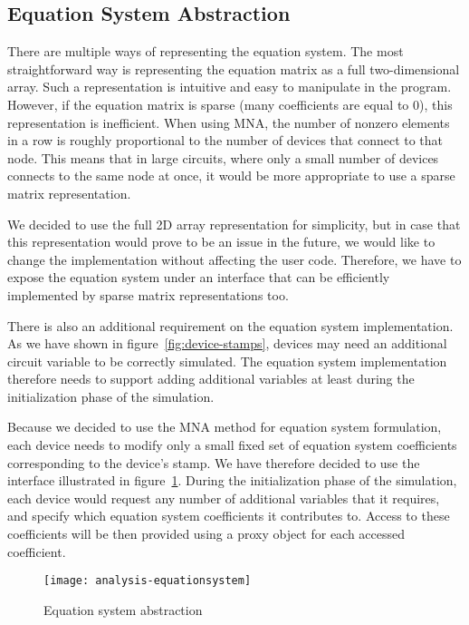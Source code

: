 \subsection{Equation System Abstraction}
\label{chap:analysis:equation}
There are multiple ways of representing the equation system. The most straightforward way is representing the equation matrix as a full two-dimensional array. Such a representation is intuitive and easy to manipulate in the program. However, if the equation matrix is sparse (many coefficients are equal to 0), this representation is inefficient. When using MNA, the number of nonzero elements in a row is roughly proportional to the number of devices that connect to that node. This means that in large circuits, where only a small number of devices connects to the same node at once, it would be more appropriate to use a sparse matrix representation.

We decided to use the full 2D array representation for simplicity, but in case that this representation would prove to be an issue in the future, we would like to change the implementation without affecting the user code. Therefore, we have to expose the equation system under an interface that can be efficiently implemented by sparse matrix representations too.

There is also an additional requirement on the equation system implementation. As we have shown in figure~\ref{fig:device-stamps}, devices may need an additional circuit variable to be correctly simulated. The equation system implementation therefore needs to support adding additional variables at least during the initialization phase of the simulation.

Because we decided to use the MNA method for equation system formulation, each device needs to modify only a small fixed set of equation system coefficients corresponding to the device's stamp. We have therefore decided to use the interface illustrated in figure~\ref{fig:analysis-equationsystem}. During the initialization phase of the simulation, each device would request any number of additional variables that it requires, and specify which equation system coefficients it contributes to. Access to these coefficients will be then provided using a proxy object for each accessed coefficient. 

\begin{figure}[h]
	\centering
	\texttt{[image: analysis-equationsystem]}
	\caption{Equation system abstraction}
	\label{fig:analysis-equationsystem}
\end{figure}

